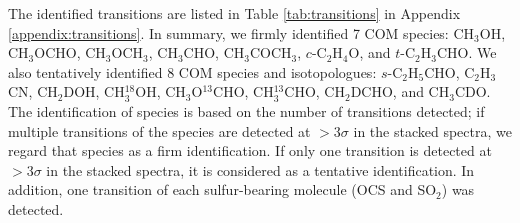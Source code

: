 \documentclass[linenumbers, twocolumn, twocolappendix, astrosymb, times]{aastex631}
\newcommand{\methanol}{CH$_3$OH\xspace}
\newcommand{\acetaldehyde}{CH$_3$CHO\xspace}
\newcommand{\methylformate}{CH$_3$OCHO\xspace}
\newcommand{\dimethylether}{CH$_3$OCH$_3$\xspace}
\newcommand{\acetone}{CH$_3$COCH$_3$\xspace}
\newcommand{\ethyleneoxide}{$c$-C$_2$H$_4$O\xspace}
\newcommand{\propenal}{$t$-C$_2$H$_3$CHO\xspace}
\newcommand{\propanal}{$s$-C$_2$H$_5$CHO\xspace}
\begin{document}
The identified transitions are listed in Table \ref{tab:transitions} in Appendix \ref{appendix:transitions}. In summary, we firmly identified 7 COM species: \methanol, \methylformate, \dimethylether, \acetaldehyde, \acetone, \ethyleneoxide, and \propenal. We also tentatively identified 8 COM species and isotopologues: \propanal, C$_2$H$_3$CN, CH$_2$DOH, CH$_3^{18}$OH, CH$_3$O$^{13}$CHO, CH$_3^{13}$CHO, CH$_2$DCHO, and CH$_3$CDO. The identification of species is based on the number of transitions detected; if multiple transitions of the species are detected at $>3\sigma$ in the stacked spectra, we regard that species as a firm identification. If only one transition is detected at $>3\sigma$ in the stacked spectra, it is considered as a tentative identification. In addition, one transition of each sulfur-bearing molecule (OCS and SO$_2$) was detected.

\begin{figure*}
\caption{Spectra corrected for Keplerian rotation toward the V883 Ori disk (grey). The model spectra for each species are shown in colored lines. }
\label{fig:spectra_gallery}
\end{figure*}

\begin{figure*}
\caption{Velocity-integrated intensity maps of the molecular line emission in the V883 Ori disk. The velocity range for integration are $\pm3.5$ km s$^{-1}$ with respect to the source systemic velocity $v_\mathrm{sys}=4.25$ km s$^{-1}$ \citep{Tobin2023} including \dimethylether and \acetone, where multiple blended transitions are integrated together. The molecular species, transitions, and upper state energy levels are indicated in the upper-left corner of each panel. The black contours start from 5$\sigma$ with steps of 2.5$\sigma$, where $\sigma$ are the noise level of each map measured on the emission-free region. The synthesized beam and a scale bar of 80 au are shown in the lower left and right corner of each panel, respectively.}
\label{fig:moment_zero_gallery}
\end{figure*}


\end{document}
